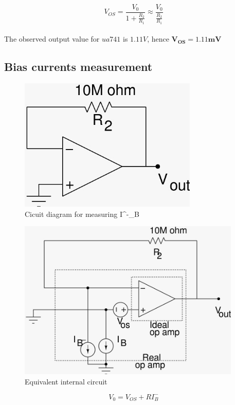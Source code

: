 \documentclass[12pt]{article}
\begin{document}
        \begin{equation}
            V_{OS} = \frac{V_0}{1 + \frac{R_2}{R_1}} \approx \frac{V_0}{\frac{R_2}{R_1}}  
        \end{equation}
        \\
        The observed output value for $ua 741$ is  $1.11V$, hence $\mathbf{V_{OS} = 1.11mV}$


\subsection{Bias currents measurement}
      \begin{figure}[H]
            \centering
            \includegraphics[width = 0.5\linewidth, height = 2.5in]{ibminus.jpeg}
            \caption{Cicuit diagram for measuring I^-_B}
        \end{figure}
        \begin{figure}[H]
            \centering
            \includegraphics[width = 0.8\linewidth, height = 3in]{ibminusreal.jpeg}
            \caption{Equivalent internal circuit}
        \end{figure}
            \begin{equation}
            V_0 = V_{OS} + RI^-_B
        \end{equation}
        
\end{document}
